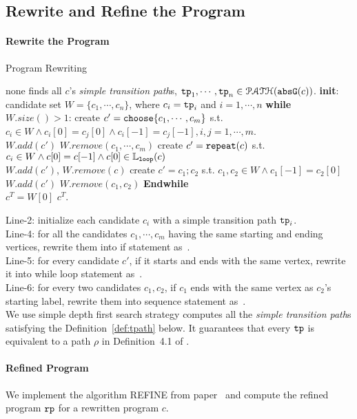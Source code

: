 \subsection{Rewrite and Refine the Program}
\paragraph{Rewrite the Program}
\begin{algorithm}
  \caption*{Program Rewriting}
  \label{alg:alg-refine_rewrite}
  \begin{algorithmic}[1]
    \REQUIRE none
    \STATE finds all $c$'s \emph{simple transition path}s, $\mathtt{tp}_1, \cdots, \mathtt{tp}_n \in \mathcal{PATH}(\mathtt{abs}{\mathtt{G}}(c))$.
    \STATE \textbf{init}: candidate set $W = \{c_1, \cdots, c_n\}$, where $c_i = \mathtt{tp}_i$ and $i = 1, \cdots, n$
    \STATE \textbf{while} $W.size()> 1$:
    \STATE \quad create $c' = \rpchoose{c_1, \cdots, c_m}$ 
    s.t. $c_i \in W \land c_i[0] = c_j[0] \land c_i[-1] = c_j[-1], i, j = 1, \cdots, m$.
    \\ \quad $W.add(c')$ \qquad $W.remove(c_1, \cdots, c_m)$
    \STATE
    \quad create $c' = \mathtt{repeat}(c)$ s.t. $c_i \in W \land c[0] = c[-1] \land c[0] \in \mathbb{L}_{\mathtt{loop}}(c)$
    \\ \quad $W.add(c')$, \qquad $W.remove(c)$
    \STATE \quad create $c' = c_1; c_2$ s.t. $c_1, c_2 \in W \land c_1[-1] = c_2[0]$
    \\
    \quad $W.add(c')$ \qquad $W.remove(c_1, c_2)$
    \STATE \textbf{Endwhile}
    \\ $c^T = W[0]$
    \RETURN $c^T$.
\end{algorithmic}
\end{algorithm}
%
Line-2: initialize each candidate $c_i$ with a simple transition path $\mathtt{tp}_i$.
\\
Line-4: for all the candidates $c_1, \cdots, c_m$ having the same starting and ending vertices, rewrite them into if statement as~\cite{GulwaniJK09}.
\\
Line-5: for every candidate $c'$, if it starts and ends with the same vertex, rewrite it into while loop statement as~\cite{GulwaniJK09}.
\\
Line-6: for every two candidates $c_1, c_2$, if $c_1$ ends with the same vertex as $c_2$'s starting label, rewrite them into sequence statement as~\cite{GulwaniJK09}.
\\
We use simple depth first search strategy computes all the \emph{simple transition path}s satisfying the Definition~\ref{def:tpath} below.
It guarantees that  every $\mathtt{tp}$ is equivalent to a path $\rho$ in Definition~4.1 of \cite{GulwaniJK09}.

\paragraph{Refined Program}
We implement the algorithm REFINE from paper~\cite{GulwaniJK09} and compute the 
refined program $\mathtt{rp}$ for a rewritten program $c$.
